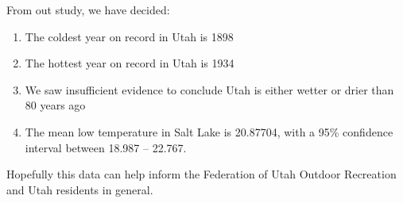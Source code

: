 \documentclass[
]{article}
\providecommand{\tightlist}{%
  \setlength{\itemsep}{0pt}\setlength{\parskip}{0pt}}
\begin{document}
From out study, we have decided:

\begin{enumerate}
\def\labelenumi{\arabic{enumi}.}
\tightlist
\item
  The coldest year on record in Utah is 1898
\item
  The hottest year on record in Utah is 1934
\item
  We saw insufficient evidence to conclude Utah is either wetter or
  drier than 80 years ago
\item
  The mean low temperature in Salt Lake is 20.87704, with a 95\%
  confidence interval between 18.987 -- 22.767.
\end{enumerate}

Hopefully this data can help inform the Federation of Utah Outdoor
Recreation and Utah residents in general.
\end{document}

